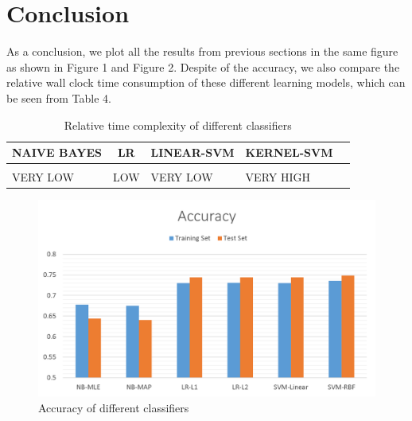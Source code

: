 \documentclass{article} %
\begin{document}
\section{Conclusion}
As a conclusion, we plot all the results from previous sections in the same figure as shown in Figure 1 and Figure 2. Despite of the accuracy, we also compare the relative wall clock time consumption of these different learning models, which can be seen from Table 4. 

\begin{table}[H]
\caption{Relative time complexity of different classifiers}
\begin{center}
\begin{tabular}{lllll}
\multicolumn{1}{c}{\bf NAIVE BAYES}  &\multicolumn{1}{c}{\bf LR} &\multicolumn{1}{c}{\bf LINEAR-SVM} &\multicolumn{1}{c}{\bf KERNEL-SVM}
\\ \hline \\

VERY LOW  &LOW &VERY LOW &VERY HIGH\\

\end{tabular}
\end{center}
\end{table}

\begin{figure}[H]
\begin{center}
\includegraphics[scale=0.4]{Accuracy.png}
\end{center}
\caption{Accuracy of different classifiers}
\end{figure}
\end{document}
